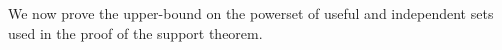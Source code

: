 \documentclass[../paper.tex]{subfiles}
\begin{document}

We now prove the upper-bound on the powerset of useful and independent sets used
in the proof of the support theorem.
\end{document}

